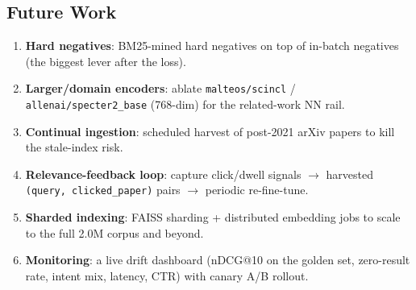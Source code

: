 \documentclass[12pt,a4paper]{article}
\begin{document}
\subsection{Future Work}
\begin{enumerate}\setlength\itemsep{0.15em}
  \item \textbf{Hard negatives}: BM25-mined hard negatives on top of in-batch negatives (the biggest lever after the loss).
  \item \textbf{Larger/domain encoders}: ablate \texttt{malteos/scincl} / \texttt{allenai/specter2\_base} (768-dim) for the related-work NN rail.
  \item \textbf{Continual ingestion}: scheduled harvest of post-2021 arXiv papers to kill the stale-index risk.
  \item \textbf{Relevance-feedback loop}: capture click/dwell signals $\rightarrow$ harvested \texttt{(query, clicked\_paper)} pairs $\rightarrow$ periodic re-fine-tune.
  \item \textbf{Sharded indexing}: FAISS sharding + distributed embedding jobs to scale to the full 2.0M corpus and beyond.
  \item \textbf{Monitoring}: a live drift dashboard (nDCG@10 on the golden set, zero-result rate, intent mix, latency, CTR) with canary A/B rollout.
\end{enumerate}
\end{document}
